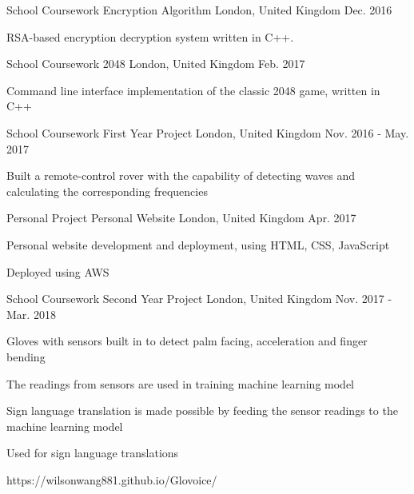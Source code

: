 
\begin{cventries}
  \cventry
    {School Coursework} %
    {Encryption Algorithm} %
    {London, United Kingdom} %
    {Dec. 2016} %
    {
      \begin{cvitems} %
        \item {RSA-based encryption decryption system written in C++.}
      \end{cvitems}
    }
    
    \cventry
    {School Coursework} %
    {2048} %
    {London, United Kingdom} %
    {Feb. 2017} %
    {
      \begin{cvitems} %
        \item {Command line interface implementation of the classic 2048 game, written in C++}
      \end{cvitems}
    }
    
    \cventry
    {School Coursework} %
    {First Year Project} %
    {London, United Kingdom} %
    {Nov. 2016 - May. 2017} %
    {
      \begin{cvitems} %
        \item {Built a remote-control rover with the capability of detecting waves
        and calculating the corresponding frequencies}
      \end{cvitems}
    }
    
    \cventry
    {Personal Project} %
    {Personal Website} %
    {London, United Kingdom} %
    {Apr. 2017} %
    {
      \begin{cvitems} %
        \item {Personal website development and deployment, using HTML, CSS, JavaScript}
        \item {Deployed using AWS}
      \end{cvitems}
    }
    
    \cventry
    {School Coursework} %
    {Second Year Project} %
    {London, United Kingdom} %
    {Nov. 2017 - Mar. 2018} %
    {
      \begin{cvitems} %
        \item {Gloves with sensors built in to detect palm facing, acceleration and finger bending}
        \item {The readings from sensors are used in training machine learning model}
        \item {Sign language translation is made possible by feeding the sensor readings to the machine learning model}
        \item {Used for sign language translations}
        \item {https://wilsonwang881.github.io/Glovoice/}
      \end{cvitems}
    }
    

\end{cventries}
